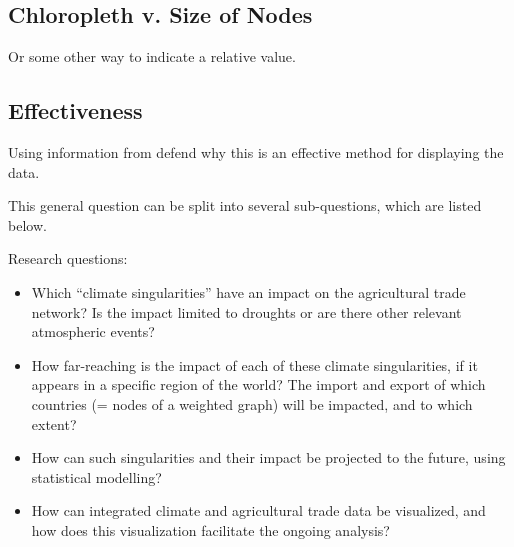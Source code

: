 \subsection{Chloropleth v. Size of Nodes}
Or some other way to indicate a relative value.
\subsection{Effectiveness}
Using information from \cite{preston2011putting} defend why this is an effective method for displaying the data.



This general question can be split into several sub-questions, which are listed below.\par
Research questions:
\begin{itemize}
	\item Which “climate singularities” have an impact on the agricultural trade network? Is the impact limited to droughts or are there other relevant atmospheric events?
	\item How far-reaching is the impact of each of these climate singularities, if it appears in a specific region of the world? The import and export of which countries (= nodes of a weighted graph) will be impacted, and to which extent?
	\item How can such singularities and their impact be projected to the future, using statistical modelling?
	\item How can integrated climate and agricultural trade data be visualized, and how does this visualization facilitate the ongoing analysis?	
\end{itemize}\par
